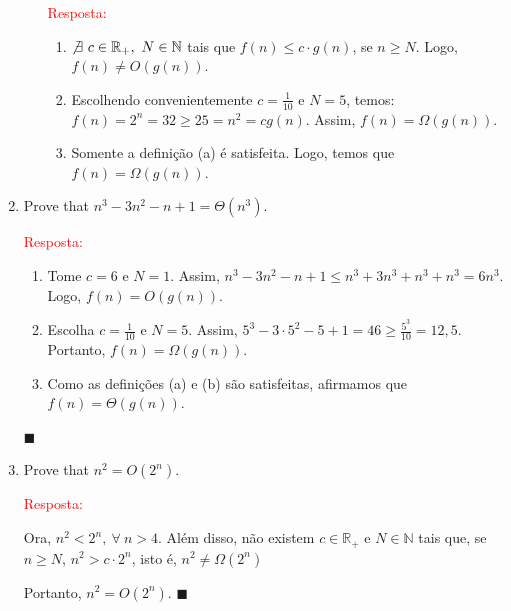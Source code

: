 \documentclass{article}
\newcommand*{\QEDA}{\hfill\ensuremath{\blacksquare}}%
\begin{document}
\begin{enumerate}[label=\Alph*]
\begin{itemize}
      \textcolor{red}{Resposta: } 
      
      \begin{enumerate}[itemsep=0cm, label=(\alph*)]
          \item $\not \exists~c \in \mathbb{R}_+,~N \in \mathbb{N}$ tais que $f(n) \leq c\cdot g(n)$, se $n \geq N$. Logo, $f(n)\not =O(g(n))$.
         
          \item Escolhendo convenientemente $c=\frac{1}{10}$ e $N=5$, temos: $f(n)=2^{n}=32 \geq 25=n^{2}=c g(n)$. Assim, $f(n)=\Omega(g(n))$. 
          
          \item Somente a definição (a) é satisfeita. Logo, temos que $f(n)=\Omega(g(n))$. 
      \end{enumerate}
    \end{itemize}
  
  \vspace{\baselineskip}
  \item Prove that $n^3 -3n^2 -n+1 = \Theta(n^3)$.
  
  \textcolor{red}{Resposta: } 
  
    \begin{enumerate}[itemsep=0cm, label=(\alph*)]
      \item Tome $c=6$ e $N=1$. Assim, $n^{3}-3 n^{2}-n+1 \leq n^{3}+3 n^{3}+n^{3}+n^{3}=6 n^{3}$. Logo, $f(n) =O(g(n))$.
      
      \item Escolha $c=\frac{1}{10}$ e $N=5$. Assim, $5^{3}-3 \cdot 5^{2}-5+1=46 \geq \frac{5^{3}}{10} = 12,5$. Portanto, $f(n)=\Omega(g(n))$.
      
      \item Como as definições (a) e (b) são satisfeitas, afirmamos que $f(n)=\Theta(g(n))$. 
    \end{enumerate} \QEDA
    
  \item Prove that $n^2 = O(2^n)$.

  \textcolor{red}{Resposta: } 
  
    Ora, $n^2<2^n,~\forall~n > 4$. Além disso, não existem $c \in \mathbb{R}_+$ e $N \in \mathbb{N}$ tais que, se $n \geq N$,  $ n^{2}>c \cdot 2^{n}$, isto é, $n^2 \not = \Omega(2^n)$
    
    Portanto, $n^2 = O(2^n)$. \QEDA
  
\end{enumerate}
\end{document}
